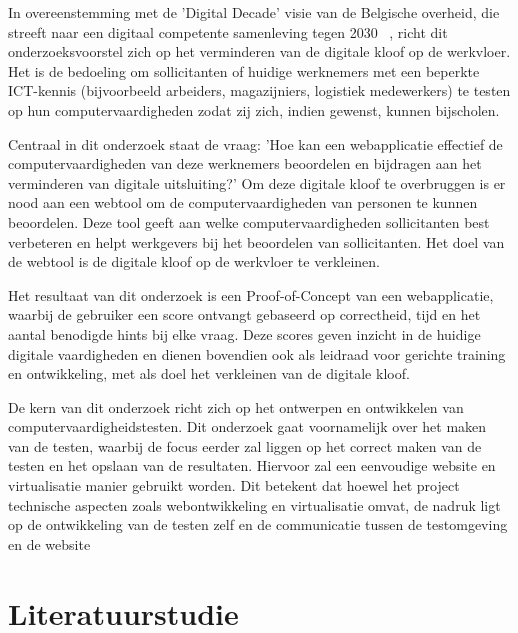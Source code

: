 In overeenstemming met de 'Digital Decade' visie van de Belgische overheid, die streeft naar een digitaal competente samenleving tegen 2030 ~\autocite{DigitalDecade2030}, richt dit onderzoeksvoorstel zich op het verminderen van de digitale kloof op de werkvloer. Het is de bedoeling om sollicitanten of huidige werknemers met een beperkte ICT-kennis (bijvoorbeeld arbeiders, magazijniers, logistiek medewerkers) te testen op hun computervaardigheden zodat zij zich, indien gewenst, kunnen bijscholen.

Centraal in dit onderzoek staat de vraag: 'Hoe kan een webapplicatie effectief de computervaardigheden van deze werknemers beoordelen en bijdragen aan het verminderen van digitale uitsluiting?' Om deze digitale kloof te overbruggen is er nood aan een webtool om de computervaardigheden van personen te kunnen beoordelen.
Deze tool geeft aan welke computervaardigheden sollicitanten best verbeteren en helpt werkgevers bij het beoordelen van sollicitanten. Het doel van de webtool is de digitale kloof op de werkvloer te verkleinen.

Het resultaat van dit onderzoek is een Proof-of-Concept van een webapplicatie, waarbij de gebruiker een score ontvangt gebaseerd op correctheid, tijd en het aantal benodigde hints bij elke vraag. Deze scores geven inzicht in de huidige digitale vaardigheden en dienen bovendien ook als leidraad voor gerichte training en ontwikkeling, met als doel het verkleinen van de digitale kloof.

De kern van dit onderzoek richt zich op het ontwerpen en ontwikkelen van computervaardigheidstesten. Dit onderzoek gaat voornamelijk over het maken van de testen, waarbij de focus eerder zal liggen op het correct maken van de testen en het opslaan van de resultaten. Hiervoor zal een eenvoudige website en virtualisatie manier gebruikt worden. Dit betekent dat hoewel het project technische aspecten zoals webontwikkeling en virtualisatie omvat, de nadruk ligt op de ontwikkeling van de testen zelf en de communicatie tussen de testomgeving en de website


\section{Literatuurstudie}%
\label{sec:state-of-the-art}


